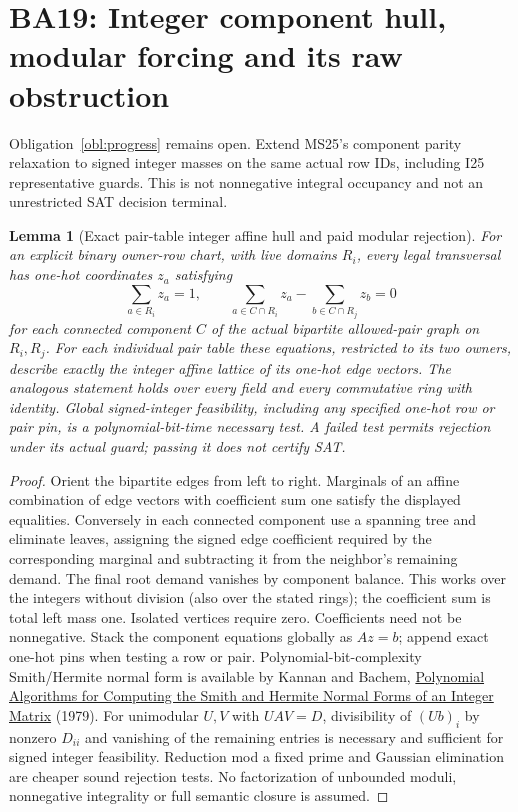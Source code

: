\documentclass[11pt]{article}
\newtheorem{lemma}[theorem]{Lemma}
\begin{document}
\section{BA19: Integer component hull, modular forcing and its raw obstruction}\label{sec:ba19}
Obligation~\ref{obl:progress} remains open. Extend MS25's component parity relaxation to signed integer masses on the same actual row IDs, including I25 representative guards. This is not nonnegative integral occupancy and not an unrestricted SAT decision terminal.
\begin{lemma}[Exact pair-table integer affine hull and paid modular rejection]\label{lem:ba19-lattice}
For an explicit binary owner-row chart, with live domains $R_i$, every legal transversal has one-hot coordinates $z_a$ satisfying
\[
 \sum_{a\in R_i}z_a=1,\qquad
 \sum_{a\in C\cap R_i}z_a-\sum_{b\in C\cap R_j}z_b=0
\]
for each connected component $C$ of the actual bipartite allowed-pair graph on $R_i,R_j$. For each individual pair table these equations, restricted to its two owners, describe exactly the integer affine lattice of its one-hot edge vectors. The analogous statement holds over every field and every commutative ring with identity. Global signed-integer feasibility, including any specified one-hot row or pair pin, is a polynomial-bit-time necessary test. A failed test permits rejection under its actual guard; passing it does not certify SAT.
\end{lemma}
\begin{proof}
Orient the bipartite edges from left to right. Marginals of an affine combination of edge vectors with coefficient sum one satisfy the displayed equalities. Conversely in each connected component use a spanning tree and eliminate leaves, assigning the signed edge coefficient required by the corresponding marginal and subtracting it from the neighbor's remaining demand. The final root demand vanishes by component balance. This works over the integers without division (also over the stated rings); the coefficient sum is total left mass one. Isolated vertices require zero. Coefficients need not be nonnegative. Stack the component equations globally as $Az=b$; append exact one-hot pins when testing a row or pair. Polynomial-bit-complexity Smith/Hermite normal form is available by Kannan and Bachem, \href{https://doi.org/10.1137/0208040}{Polynomial Algorithms for Computing the Smith and Hermite Normal Forms of an Integer Matrix} (1979). For unimodular $U,V$ with $UAV=D$, divisibility of $(Ub)_i$ by nonzero $D_{ii}$ and vanishing of the remaining entries is necessary and sufficient for signed integer feasibility. Reduction mod a fixed prime and Gaussian elimination are cheaper sound rejection tests. No factorization of unbounded moduli, nonnegative integrality or full semantic closure is assumed.
\end{proof}
\end{document}
